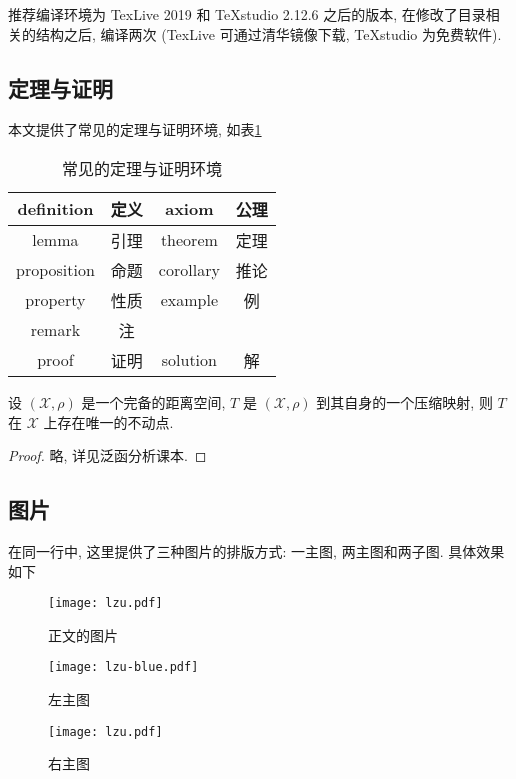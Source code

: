 \documentclass{lzuthesis}
\begin{document}
推荐编译环境为 TexLive 2019 和 TeXstudio 2.12.6 之后的版本,
在修改了目录相关的结构之后, 编译两次 (TexLive 可通过清华镜像下载,
TeXstudio 为免费软件).

\subsection{定理与证明}

本文提供了常见的定理与证明环境, 如表\ref{table1}

\begin{table}[!h]
\centering
\begin{tabular}{|cc|cc|} \hline
	definition 	& 定义 &
	axiom 		& 公理 \\ \hline
	lemma 		& 引理 &
	theorem 	& 定理 \\ \hline
	proposition & 命题 &
	corollary 	& 推论 \\ \hline
	property 	& 性质 &
	example 	& 例 \\ \hline
	remark 		& 注 & & \\ \hline
	proof		& 证明 &
	solution	& 解 \\ \hline
\end{tabular}
\caption{常见的定理与证明环境}
\label{table1}
\end{table}

\begin{theorem}
	\label{thm1}
	设 $(\mathscr{X}, \rho)$ 是一个完备的距离空间, $T$ 是 $(\mathscr{X},
	\rho)$ 到其自身的一个压缩映射, 则 $T$ 在 $\mathscr{X}$
	上存在唯一的不动点.
\end{theorem}

\begin{proof}
	略, 详见泛函分析课本. 
\end{proof}

\subsection{图片}

在同一行中, 这里提供了三种图片的排版方式: 一主图, 两主图和两子图.
具体效果如下

\begin{figure}[!h]
	\centering
	\texttt{[image: lzu.pdf]}
	\caption{正文的图片}
	\label{zheng1}
\end{figure}

\begin{figure}[!h]
	\centering
	\begin{minipage}[t]{0.3\linewidth}
		\centering
		\texttt{[image: lzu-blue.pdf]}
		\caption{左主图}
	\end{minipage}
	\quad
	\begin{minipage}[t]{0.3\linewidth} 
		\centering 
		\texttt{[image: lzu.pdf]} 
		\caption{右主图} 
	\end{minipage}
\end{figure}
\end{document}
